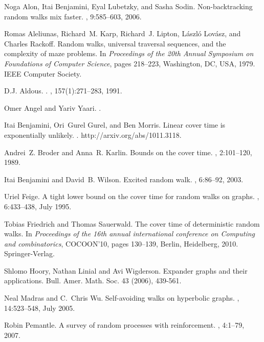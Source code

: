 \documentclass[12pt,a4paper]{article}
\newcommand{\0}{{\bf 0}}
\begin{document}
\newcommand{\etalchar}[1]{$^{#1}$}
\begin{thebibliography}{ABLS06}

Noga Alon, Itai Benjamini, Eyal Lubetzky, and Sasha Sodin.
\newblock Non-backtracking random walks mix faster.
, 9:585--603, 2006.

\bibitem[AKL{\etalchar{+}}79]{AKLLR79}
Romas Aleliunas, Richard~M. Karp, Richard~J. Lipton, L\'{a}szl\'{o} Lov\'{a}sz,
  and Charles Rackoff.
\newblock Random walks, universal traversal sequences, and the complexity of
  maze problems.
\newblock In {\em Proceedings of the 20th Annual Symposium on Foundations of
  Computer Science}, pages 218--223, Washington, DC, USA, 1979. IEEE Computer
  Society.

D.J. Aldous.
.
,
  157(1):271--283, 1991.

Omer Angel and Yariv Yaari.
.

Itai Benjamini, Ori~Gurel Gurel, and Ben Morris.
\newblock Linear cover time is exponentially unlikely.
.
\newblock http://arxiv.org/abs/1011.3118.

Andrei~Z. Broder and Anna~R. Karlin.
\newblock Bounds on the cover time.
, 2:101--120, 1989.

Itai Benjamini and David~B. Wilson.
\newblock Excited random walk.
, 6:86--92, 2003.

Uriel Feige.
\newblock A tight lower bound on the cover time for random walks on graphs.
, 6:433--438, July 1995.

Tobias Friedrich and Thomas Sauerwald.
\newblock The cover time of deterministic random walks.
\newblock In {\em Proceedings of the 16th annual international conference on
Computing and combinatorics}, COCOON'10, pages 130--139, Berlin, Heidelberg,
2010. Springer-Verlag.

Shlomo Hoory, Nathan Linial and Avi Wigderson.
\newblock Expander graphs and their applications.
\newblock Bull. Amer. Math. Soc. 43  (2006), 439-561.

Neal Madras and C.~Chris Wu.
\newblock Self-avoiding walks on hyperbolic graphs.
, 14:523--548, July 2005.

Robin Pemantle.
\newblock A survey of random processes with reinforcement.
, 4:1--79, 2007.

\end{thebibliography}
\end{document}

